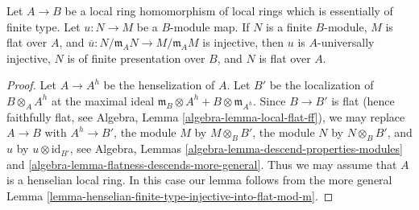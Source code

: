 \begin{lemma}
\label{lemma-upstairs-finite-type-injective-into-flat-mod-m}
Let $A \to B$ be a local ring homomorphism of local rings which is
essentially of finite type. Let $u : N \to M$ be a $B$-module map.
If $N$ is a finite $B$-module, $M$ is flat over $A$, and
$\overline{u} : N/\mathfrak m_A N \to M/\mathfrak m_A M$ is injective,
then $u$ is $A$-universally injective, $N$ is of finite presentation over
$B$, and $N$ is flat over $A$.
\end{lemma}

\begin{proof}
Let $A \to A^h$ be the henselization of $A$. Let $B'$ be the localization
of $B \otimes_A A^h$ at the maximal ideal
$\mathfrak m_B \otimes A^h + B \otimes \mathfrak m_{A^h}$.
Since $B \to B'$ is flat (hence faithfully flat, see
Algebra, Lemma \ref{algebra-lemma-local-flat-ff}),
we may replace $A \to B$ with $A^h \to B'$,
the module $M$ by $M \otimes_B B'$, the module $N$ by $N \otimes_B B'$,
and $u$ by $u \otimes \text{id}_{B'}$, see
Algebra, Lemmas \ref{algebra-lemma-descend-properties-modules} and
\ref{algebra-lemma-flatness-descends-more-general}.
Thus we may assume that $A$ is a henselian local ring.
In this case our lemma follows from the more general
Lemma \ref{lemma-henselian-finite-type-injective-into-flat-mod-m}.
\end{proof}
